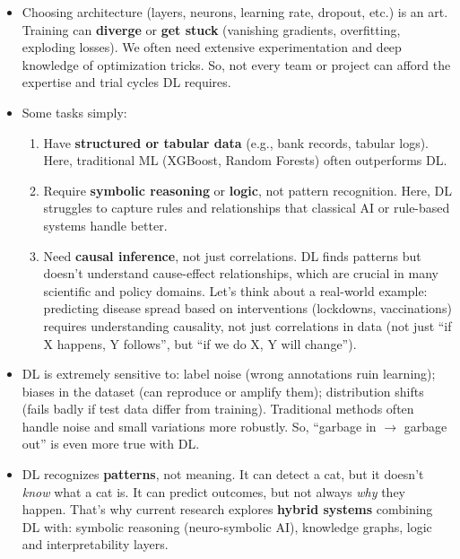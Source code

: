 \begin{deepeningbox}
\begin{itemize}
        \item {} Choosing architecture (layers, neurons, learning rate, dropout, etc.) is an art. Training can \textbf{diverge} or \textbf{get stuck} (vanishing gradients, overfitting, exploding losses). We often need extensive experimentation and deep knowledge of optimization tricks. So, not every team or project can afford the expertise and trial cycles DL requires.

        \item {} Some tasks simply:
        \begin{enumerate}
            \item Have \textbf{structured or tabular data} (e.g., bank records, tabular logs). Here, traditional ML (XGBoost, Random Forests) often outperforms DL.
            \item Require \textbf{symbolic reasoning} or \textbf{logic}, not pattern recognition. Here, DL struggles to capture rules and relationships that classical AI or rule-based systems handle better.
            \item Need \textbf{causal inference}, not just correlations. DL finds patterns but doesn't understand cause-effect relationships, which are crucial in many scientific and policy domains. Let's think about a real-world example: predicting disease spread based on interventions (lockdowns, vaccinations) requires understanding causality, not just correlations in data (not just ``if X happens, Y follows'', but ``if we do X, Y will change'').
        \end{enumerate}

        \item {} DL is extremely sensitive to: label noise (wrong annotations ruin learning); biases in the dataset (can reproduce or amplify them); distribution shifts (fails badly if test data differ from training). Traditional methods often handle noise and small variations more robustly. So, ``garbage in $\to$ garbage out'' is even more true with DL.
        
        \item {} DL recognizes \textbf{patterns}, not meaning. It can detect a cat, but it doesn't \emph{know} what a cat is. It can predict outcomes, but not always \emph{why} they happen. That's why current research explores \textbf{hybrid systems} combining DL with: symbolic reasoning (neuro-symbolic AI), knowledge graphs, logic and interpretability layers.
    \end{itemize}
\end{deepeningbox}

